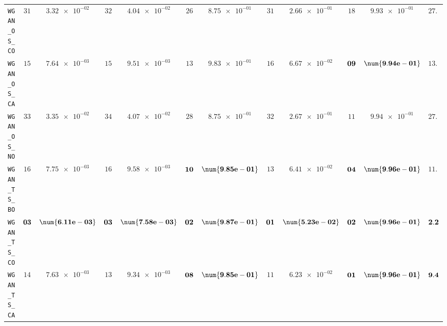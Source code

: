 \begin{table}[H]
\begin{tabularx}{\textwidth}{l||cC|cC|cC|cC|cC||c}
		\texttt{WGAN\_OS\_CO} & $ 31$ & $ \num{3.32e-02}$ & $ 32$ & $ \num{4.04e-02}$ & $ 26$ & $ \num{8.75e-01}$ & $ 31$ & $ \num{2.66e-01}$ & $ 18$ & $ \num{9.93e-01}$ & $ 27.6$  \\
		\texttt{WGAN\_OS\_CA} & $ 15$ & $ \num{7.64e-03}$ & $ 15$ & $ \num{9.51e-03}$ & $ 13$ & $ \num{9.83e-01}$ & $ 16$ & $ \num{6.67e-02}$ & $\bf 09$ & $\bf \num{9.94e-01}$ & $ 13.6$  \\
		\texttt{WGAN\_OS\_NO} & $ 33$ & $ \num{3.35e-02}$ & $ 34$ & $ \num{4.07e-02}$ & $ 28$ & $ \num{8.75e-01}$ & $ 32$ & $ \num{2.67e-01}$ & $ 11$ & $ \num{9.94e-01}$ & $ 27.6$  \\
		\texttt{WGAN\_TS\_BO} & $ 16$ & $ \num{7.75e-03}$ & $ 16$ & $ \num{9.58e-03}$ & $\bf 10$ & $\bf \num{9.85e-01}$ & $ 13$ & $ \num{6.41e-02}$ & $\bf 04$ & $\bf \num{9.96e-01}$ & $ 11.8$  \\
		\texttt{WGAN\_TS\_CO} & $\bf 03$ & $\bf \num{6.11e-03}$ & $\bf 03$ & $\bf \num{7.58e-03}$ & $\bf 02$ & $\bf \num{9.87e-01}$ & $\bf 01$ & $\bf \num{5.23e-02}$ & $\bf 02$ & $\bf \num{9.96e-01}$ & $\bf 2.2$  \\
		\texttt{WGAN\_TS\_CA} & $ 14$ & $ \num{7.63e-03}$ & $ 13$ & $ \num{9.34e-03}$ & $\bf 08$ & $\bf \num{9.85e-01}$ & $ 11$ & $ \num{6.23e-02}$ & $\bf 01$ & $\bf \num{9.96e-01}$ & $\bf 9.4$  \\

\end{tabularx}
\end{table}
